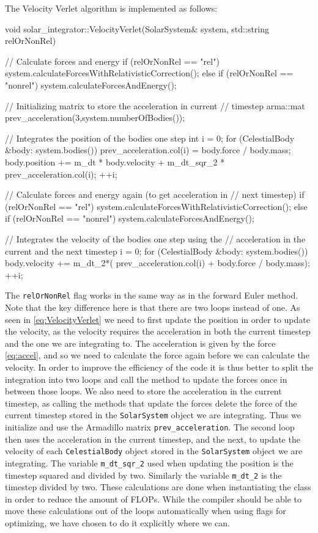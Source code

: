 \documentclass[reprint,english,notitlepage]{revtex4-1}  %
\begin{document}
The Velocity Verlet algorithm is implemented as follows:

\begin{cpp}
void solar_integrator::VelocityVerlet(SolarSystem& system,
									  std::string relOrNonRel) {
  // Calculate forces and energy
  if (relOrNonRel == "rel") {
    system.calculateForcesWithRelativisticCorrection();
  } else if (relOrNonRel == "nonrel") {
    system.calculateForcesAndEnergy();
  }

  // Initializing matrix to store the acceleration in current 
  // timestep
  arma::mat prev_acceleration(3,system.numberOfBodies());

  // Integrates the position of the bodies one step
  int i = 0;
  for (CelestialBody &body: system.bodies()) {
    prev_acceleration.col(i) = body.force / body.mass;
    body.position += m_dt * body.velocity 
    				 + m_dt_sqr_2 * prev_acceleration.col(i);
    ++i;
  }

  // Calculate forces and energy again (to get acceleration in 
  // next timestep)
  if (relOrNonRel == "rel") {
    system.calculateForcesWithRelativisticCorrection();
  } else if (relOrNonRel == "nonrel") {
    system.calculateForcesAndEnergy();
  }

  // Integrates the velocity of the bodies one step using the 
  // acceleration in the current and the next timestep
  i = 0;
  for (CelestialBody &body: system.bodies()) {
    body.velocity += m_dt_2*( prev_acceleration.col(i) 
    				 + body.force / body.mass);
    ++i;
  }
}
\end{cpp}

The \verb+relOrNonRel+ flag works in the same way as in the forward Euler method. Note that the key difference here is that there are two loops instead of one. As seen in \eqref{eq:VelocityVerlet} we need to first update the position in order to update the velocity, as the velocity requires the acceleration in both the current timestep and the one we are integrating to. The acceleration is given by the force \eqref{eq:accel}, and so we need to calculate the force again before we can calculate the velocity. In order to improve the efficiency of the code it is thus better to split the integration into two loops and call the method to update the forces once in between those loops. We also need to store the acceleration in the current timestep, as calling the methods that update the forces delete the force of the current timestep stored in the \verb+SolarSystem+ object we are integrating. Thus we initialize and use the Armadillo \citep{Armadillo} matrix \verb+prev_acceleration+. The second loop then uses the acceleration in the current timestep, and the next, to update the velocity of each \verb+CelestialBody+ object stored in the \verb+SolarSystem+ object we are integrating. The variable \verb+m_dt_sqr_2+ used when updating the position is the timestep squared and divided by two. Similarly the variable \verb+m_dt_2+ is the timestep divided by two. These calculations are done when instantiating the class in order to reduce the amount of FLOPs. While the compiler should be able to move these calculations out of the loops automatically when using flags for optimizing, we have chosen to do it explicitly where we can.
\end{document}
